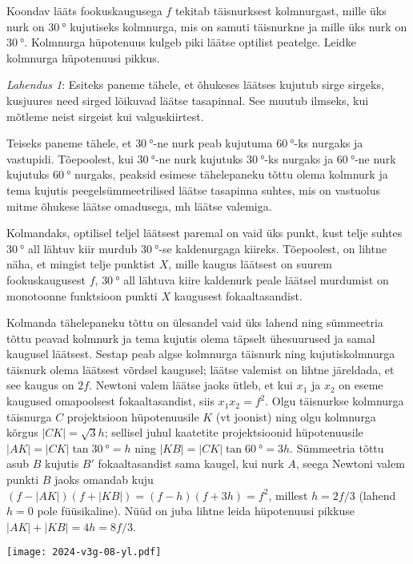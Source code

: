 
Koondav lääts fookuskaugusega $f$ tekitab täisnurksest kolmnurgast, mille üks nurk on $\SI{30}{\degree}$ kujutiseks kolmnurga, mis on samuti täisnurkne ja mille üks nurk on  $\SI{30}{\degree}$. Kolmnurga hüpotenuus kulgeb piki läätse optilist peatelge. Leidke kolmnurga hüpotenuusi pikkus.


\hint

\solu
\textit{Lahendus 1}:
Esiteks paneme tähele, et õhukeses läätses kujutub sirge sirgeks, kusjuures need sirged lõikuvad läätse tasapinnal. See muutub ilmseks, kui mõtleme neist sirgeist kui valguskiirtest.

Teiseks paneme tähele, et $\SI{30}{\degree}$-ne nurk peab kujutuma  $\SI{60}\degree$-ks nurgaks ja vastupidi. Tõepoolest, kui  $\SI{30}\degree$-ne nurk kujutuks  $\SI{30}\degree$-ks nurgaks ja  $\SI{60}\degree$-ne nurk kujutuks  $\SI{60}\degree$ nurgaks, peaksid esimese tähelepaneku tõttu olema kolmnurk ja tema kujutis peegelsümmeetrilised läätse tasapinna suhtes, mis on vastuolus mitme õhukese läätse omadusega, mh läätse valemiga.

Kolmandaks, optilisel teljel läätsest paremal on vaid üks punkt, kust telje suhtes $\SI{30}\degree$ all lähtuv kiir murdub  $\SI{30}\degree$-se kaldenurgaga kiireks. Tõepoolest, on lihtne näha, et mingist telje punktist $X$, mille kaugus läätsest on suurem fookuskaugusest $f$, $\SI{30}\degree$  all lähtuva kiire kaldenurk peale läätsel murdumist on monotoonne funktsioon punkti $X$ kaugusest fokaaltasandist.

Kolmanda tähelepaneku tõttu on ülesandel vaid üks lahend ning sümmeetria tõttu peavad kolmnurk ja tema kujutis olema täpselt ühesuurused ja samal kaugusel läätsest. Sestap peab algse kolmnurga täisnurk ning kujutiskolmnurga täisnurk olema läätsest võrdsel kaugusel; läätse valemist on lihtne järeldada, et see kaugus on $2f$. Newtoni valem läätse jaoks ütleb, et kui $x_1$ ja $x_2$ on eseme kaugused omapoolsest fokaaltasandist, siis $x_1x_2=f^2$. Olgu täisnurkse kolmnurga täisnurga $C$ projektsioon hüpotenuusile $K$ (vt joonist) ning olgu kolmnurga kõrgus $|CK|=\sqrt 3h$; sellisel juhul kaatetite projektsioonid hüpotenuusile $|AK|=|CK|\tan \SI{30}\degree=h$ ning $|KB|=|CK|\tan \SI{60}\degree=3h$. Sümmeetria tõttu asub $B$ kujutis $B'$ fokaaltasandist sama kaugel, kui nurk $A$, seega Newtoni valem punkti $B$ jaoks omandab kuju $(f-|AK|)(f+|KB|)=(f-h)(f+3h)=f^2$, millest $h=2f/3$ (lahend $h=0$ pole füüsikaline). Nüüd on juba lihtne leida hüpotenuusi pikkuse $|AK|+|KB|=4h=8f/3$.
\begin{center}
  \texttt{[image: 2024-v3g-08-yl.pdf]}
\end{center}

